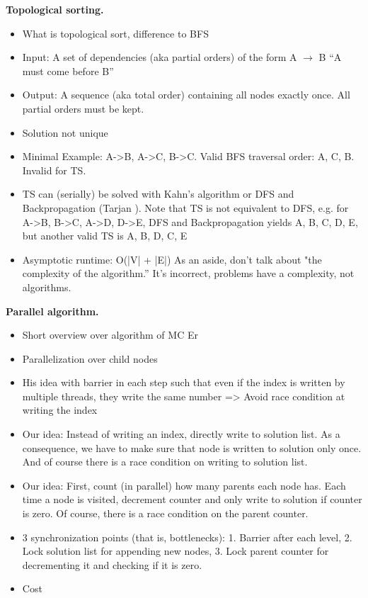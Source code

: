 \documentclass[letterpaper]{article}
\newcommand{\mypar}[1]{{\bf #1.}}
\begin{document}
 
 \begin{invisible}
 \mypar{Topological sorting}
 \begin{itemize}
  \item What is topological sort, difference to BFS
  \item Input: A set of dependencies (aka partial orders) of the form A $\rightarrow$ B ``A must come before B''
  \item Output: A sequence (aka total order) containing all nodes exactly once. All partial orders must be kept.
  \item Solution not unique
  \item Minimal Example: A->B, A->C, B->C. Valid BFS traversal order: A, C, B. Invalid for TS.
  \item TS can (serially) be solved with Kahn's algorithm \cite{kahn1962topological} or DFS and Backpropagation (Tarjan \cite{tarjan1976edge}). %
        Note that TS is not equivalent to DFS, e.g. for A->B, B->C, A->D, D->E, DFS and Backpropagation yields A, B, C, D, E, but another valid TS is A, B, D, C, E
  \item Asymptotic runtime: O(|V| + |E|)
As an aside, don't talk about "the complexity of the algorithm.'' It's incorrect,
problems have a complexity, not algorithms.  
 \end{itemize}

 \mypar{Parallel algorithm}
 \begin{itemize}
  \item Short overview over algorithm of MC Er
  \item Parallelization over child nodes
  \item His idea with barrier in each step such that even if the index is written by multiple threads, they write the same number => Avoid race condition at writing the index
  \item Our idea: Instead of writing an index, directly write to solution list. As a consequence, we have to make sure that node is written to solution only once. And of course there is a race condition on writing to solution list.
  \item Our idea: First, count (in parallel) how many parents each node has. Each time a node is visited, decrement counter and only write to solution if counter is zero. Of course, there is a race condition on the parent counter.
  \item 3 synchronization points (that is, bottlenecks): 1. Barrier after each level, 2. Lock solution list for appending new nodes, 3. Lock parent counter for decrementing it and checking if it is zero.
  \item Cost
 \end{itemize}

 
\end{invisible}
\end{document}
